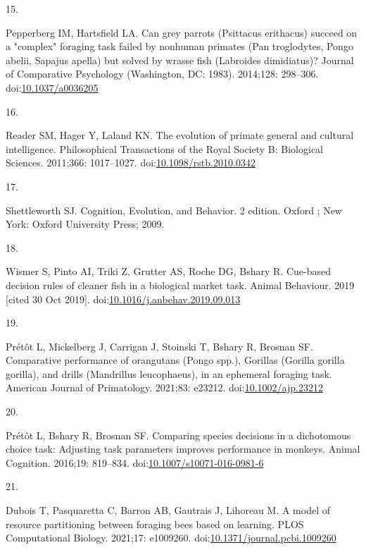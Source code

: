 \documentclass[10pt,letterpaper]{article}
\newlength{\cslhangindent}
\newlength{\csllabelwidth}
\newlength{\cslentryspacingunit} %
\newenvironment{CSLReferences}[2] %
 {%
  \setlength{\parindent}{0pt}
  \ifodd #1
  \let\oldpar\par
  \def\par{\hangindent=\cslhangindent\oldpar}
  \fi
  \setlength{\parskip}{#2\cslentryspacingunit}
 }%
 {}
\newcommand{\CSLLeftMargin}[1]{\parbox[t]{\csllabelwidth}{#1}}
\newcommand{\CSLRightInline}[1]{\parbox[t]{\linewidth - \csllabelwidth}{#1}\break}
\begin{document}
\begin{CSLReferences}{0}{0}
\leavevmode{}%
\CSLLeftMargin{15. }
\CSLRightInline{Pepperberg IM, Hartsfield LA. Can grey parrots
({Psittacus} erithacus) succeed on a "complex" foraging task failed by
nonhuman primates ({Pan} troglodytes, {Pongo} abelii, {Sapajus} apella)
but solved by wrasse fish ({Labroides} dimidiatus)? Journal of
Comparative Psychology (Washington, DC: 1983). 2014;128: 298--306.
doi:\href{https://doi.org/10.1037/a0036205}{10.1037/a0036205}}

\leavevmode{}%
\CSLLeftMargin{16. }
\CSLRightInline{Reader SM, Hager Y, Laland KN. The evolution of primate
general and cultural intelligence. Philosophical Transactions of the
Royal Society B: Biological Sciences. 2011;366: 1017--1027.
doi:\href{https://doi.org/10.1098/rstb.2010.0342}{10.1098/rstb.2010.0342}}

\leavevmode{}%
\CSLLeftMargin{17. }
\CSLRightInline{Shettleworth SJ. Cognition, {Evolution}, and {Behavior}.
2 edition. Oxford ; New York: Oxford University Press; 2009. }

\leavevmode{}%
\CSLLeftMargin{18. }
\CSLRightInline{Wismer S, Pinto AI, Triki Z, Grutter AS, Roche DG,
Bshary R. Cue-based decision rules of cleaner fish in a biological
market task. Animal Behaviour. 2019 {[}cited 30 Oct 2019{]}.
doi:\href{https://doi.org/10.1016/j.anbehav.2019.09.013}{10.1016/j.anbehav.2019.09.013}}

\leavevmode{}%
\CSLLeftMargin{19. }
\CSLRightInline{Prétôt L, Mickelberg J, Carrigan J, Stoinski T, Bshary
R, Brosnan SF. Comparative performance of orangutans ({Pongo} spp.),
Gorillas ({Gorilla} gorilla gorilla), and drills ({Mandrillus}
leucophaeus), in an ephemeral foraging task. American Journal of
Primatology. 2021;83: e23212.
doi:\href{https://doi.org/10.1002/ajp.23212}{10.1002/ajp.23212}}

\leavevmode{}%
\CSLLeftMargin{20. }
\CSLRightInline{Prétôt L, Bshary R, Brosnan SF. Comparing species
decisions in a dichotomous choice task: Adjusting task parameters
improves performance in monkeys. Animal Cognition. 2016;19: 819--834.
doi:\href{https://doi.org/10.1007/s10071-016-0981-6}{10.1007/s10071-016-0981-6}}

\leavevmode{}%
\CSLLeftMargin{21. }
\CSLRightInline{Dubois T, Pasquaretta C, Barron AB, Gautrais J, Lihoreau
M. A model of resource partitioning between foraging bees based on
learning. PLOS Computational Biology. 2021;17: e1009260.
doi:\href{https://doi.org/10.1371/journal.pcbi.1009260}{10.1371/journal.pcbi.1009260}}


\end{CSLReferences}
\end{document}
